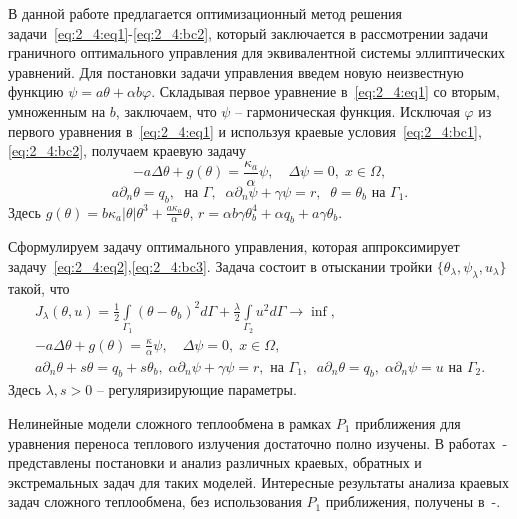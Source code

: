 В данной работе предлагается оптимизационный метод решения
задачи~\eqref{eq:2_4:eq1}-\eqref{eq:2_4:bc2},
который заключается в рассмотрении задачи граничного оптимального
управления для эквивалентной системы эллиптических уравнений.
Для постановки задачи управления введем новую неизвестную функцию
$\psi= a\theta + \alpha b \varphi$.
Складывая первое уравнение в~\eqref{eq:2_4:eq1} со вторым, умноженным на $b$,
заключаем, что $\psi$ -- гармоническая функция.
Исключая $\varphi$ из первого уравнения в~\eqref{eq:2_4:eq1} и используя краевые
условия~\eqref{eq:2_4:bc1},\eqref{eq:2_4:bc2},
получаем краевую задачу
\begin{equation}
    \label{eq:2_4:eq2}
    - a \Delta \theta + g (\theta) = \frac{\kappa_a}{\alpha}\psi, \quad
    \Delta \psi = 0, \; x \in \Omega,
\end{equation}
\begin{equation}
    \label{eq:2_4:bc3}
    a \partial_n \theta = q_b, \; \text{ на }\Gamma, \;\;
    \alpha \partial_n \psi + \gamma \psi  =  r,\;\;
    \theta = \theta_b  \text{ на }\Gamma_1.
\end{equation}
Здесь $g(\theta) = b \kappa_a|\theta|\theta^3 + \frac{a\kappa_a}{\alpha}\theta$, $r=\alpha b \gamma \theta_b^4+ \alpha q_b + a \gamma \theta_b$.

Сформулируем задачу оптимального управления, которая аппроксимирует
задачу~\eqref{eq:2_4:eq2},\eqref{eq:2_4:bc3}.
Задача состоит в отыскании тройки $\{\theta_\lambda,\psi_\lambda,u_\lambda\}$ такой, что
\begin{equation}
    \label{eq:2_4:cost}
    \begin{split}
        J_\lambda(\theta, u) =
        \frac{1}{2} \int \limits_{\Gamma_1} (\theta - \theta_b)^2 d \Gamma
        + \frac{\lambda}{2}\int\limits_{\Gamma_2} u^2 d\Gamma \rightarrow \inf, \\
        - a \Delta \theta + g (\theta) = \frac{\kappa}{\alpha}\psi, \quad
        \Delta \psi = 0, \; x \in \Omega, \\
        a \partial_n \theta + s \theta = q_b + s \theta_b,
        \; \alpha \partial_n \psi + \gamma \psi = r,
        \text{ на } \Gamma_1,\;\; a \partial_n \theta = q_b,\;
        \alpha \partial_n \psi = u \text{ на } \Gamma_2.
    \end{split}
\end{equation}
Здесь $\lambda, s > 0$ -- регуляризирующие параметры.


Нелинейные модели сложного теплообмена в рамках $P_1$ приближения для
уравнения переноса теплового излучения достаточно полно изучены.
В работах~\cite{Pinnau2007}-\cite{Mesenev22} представлены постановки
и анализ различных краевых, обратных и экстремальных задач для таких моделей.
Интересные результаты анализа краевых задач сложного теплообмена,
без использования $P_1$ приближения, получены в~\cite{Amosov16}-\cite{Amosov20-1}.


